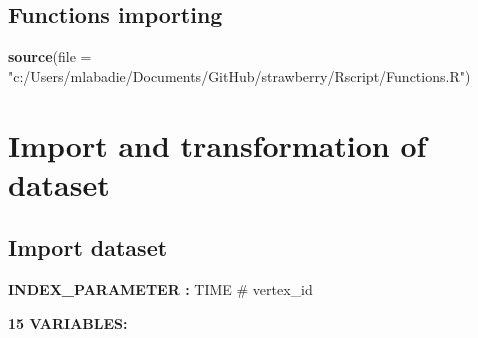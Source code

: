 \documentclass[]{article}
\newenvironment{Shaded}{\begin{snugshade}}{\end{snugshade}}
\newcommand{\KeywordTok}[1]{\textcolor[rgb]{0.13,0.29,0.53}{\textbf{#1}}}
\newcommand{\DataTypeTok}[1]{\textcolor[rgb]{0.13,0.29,0.53}{#1}}
\newcommand{\StringTok}[1]{\textcolor[rgb]{0.31,0.60,0.02}{#1}}
\newcommand{\NormalTok}[1]{#1}
\begin{document}
\subsection{Functions importing}\label{functions-importing}

\begin{Shaded}
\begin{Highlighting}[]
\KeywordTok{source}\NormalTok{(}\DataTypeTok{file =} \StringTok{"c:/Users/mlabadie/Documents/GitHub/strawberry/Rscript/Functions.R"}\NormalTok{)}
\end{Highlighting}
\end{Shaded}

\section{Import and transformation of
dataset}\label{import-and-transformation-of-dataset}

\subsection{Import dataset}\label{import-dataset}

\textbf{INDEX\_PARAMETER :} TIME \# vertex\_id

\textbf{15 VARIABLES:}
\end{document}

